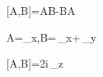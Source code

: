 [A,B]=AB-BA

A=\sigma_x,\quad B=\cos\theta\,\sigma_x+\sin\theta\,\sigma_y

[A,B]=2i\sin\theta\,\sigma_z
